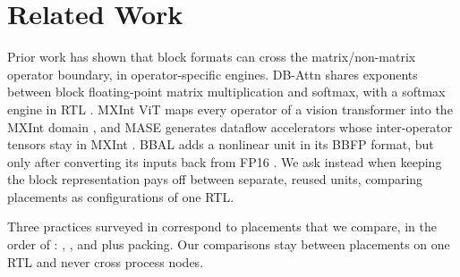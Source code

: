 
\section{Related Work}\label{sec:related}

\begin{table}[t]
\centering{}%
\caption{Closest prior work, grouped by mechanism: what each line of work answers and what it leaves open.}\label{tab:prior}

\end{table}

%
%
Prior work has shown that block formats can cross the matrix/non-matrix operator boundary, in operator-specific engines.
DB-Attn shares exponents between block floating-point matrix multiplication and softmax, with a softmax engine in RTL \cite{Wang2025DBAttn}.
MXInt ViT maps every operator of a vision transformer into the MXInt domain , and MASE generates dataflow accelerators whose inter-operator tensors stay in MXInt .
BBAL adds a nonlinear unit in its BBFP format, but only after converting its inputs back from FP16 \cite{Han2025BBAL}.
We ask instead when keeping the block representation pays off between separate, reused units, comparing placements as configurations of one RTL.

%
%
Three practices surveyed in  correspond to placements that we compare, in the order of : \armSE, \armSD, and \armSM plus packing.
Our comparisons stay between placements on one RTL and never cross process nodes.

